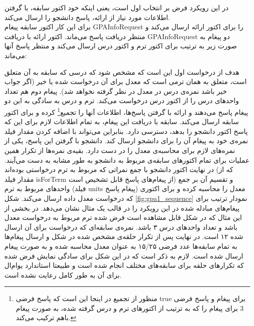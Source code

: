 در این رویکرد فرض بر انتخاب اول است، یعنی اینکه خود اکتور سابقه، با گرفتن اطلاعات مورد نیاز از ارائه، پاسخ دانشجو را ارسال می‌کند.\\
برای این کار اکتور سابقه پیغام GPAInfoRequest را برای اکتور ارائه ارسال می‌کند و منتظر دریافت پاسخ می‌ماند. اکتور ارائه با دریافت GPAInfoRequest دو پیغام به صورت زیر به ترتیب برای اکتور ترم و اکتور درس ارسال می‌کند و منتظر پاسخ آنها می‌ماند:
\begin{latin}
 \begin{description}
 \item[]
  \item[]
 \end{description}
 \end{latin}
هدف از درخواست اول این است که مشخص شود که  درسی که سابقه به آن متعلق است، متعلق به همان ترمی است که معدل برای‌ آن درخواست شده یا خیر (اگر جواب خیر باشد نمره‌ی درس در معدل در نظر گرفته نخواهد شد). پیغام دوم هم تعداد واحد‌های درس را از اکتور درس درخواست می‌کند. ترم و درس به سادگی به این دو پیغام پاسخ می‌دهند و ارائه با گرفتن پاسخ‌ها، اطلاعات آنها را تجمیع\footnote{منظور از تجمیع در اینجا این است که  پاسخ فرضی true برای پیغام  و پاسخ فرضی 3 برای پیغام  را که به ترتیب از اکتورهای ترم و درس گرفته شده، به صورت پیغام  باهم ترکیب می‌کند.} کرده و برای اکتور سابقه ارسال می‌کند.  سابقه با دریافت این پیغام، به تمام اطلاعات لازم برای این که پاسخ اکتور دانشجو را بدهد، دسترسی دارد. بنابراین می‌تواند با اضافه کردن مقدار فیلد نمره‌ی خود به پیغام آن را برای دانشجو ارسال کند. دانشجو با گرفتن این پاسخ، یکی از نمره‌های لازم برای محاسبه‌ی معدل را در دست دارد. بقیه‌ی نمره‌ها از تکرار همین عملیات برای تمام اکتورهای سابقه‌ی مربوط به دانشجو به طور مشابه به دست می‌آیند. در نهایت اکتور دانشجو با جمع نمراتی که مربوط به ترم درخواستی بوده‌اند (که از مقدار فیلد isForTerm از پیغام‌های پاسخ قابل تشخیص است) و تقسیم آن بر جمع واحد‌های مربوط به ترم (فیلد units پیغام پاسخ) معدل را محاسبه کرده و برای اکتوری که درخواست معدل داده ارسال می‌کند.
   شکل \ref{fig:gpa1_sequence} نمودار ترتیب برای پیغام‌های مبادله شده در این رویکرد را در قالب یک مثال نشان می‌دهد. در بخشی از این مثال که در شکل قابل مشاهده است فرض شده ترم مربوط به درخواست معدل باشد و تعداد واحد‌های درس ۳ باشد. نمره‌ی سابقه‌ای که درخواست برای آن ارسال شده ۱۲ است. در نهایت پس از تکرار حلقه‌ی مشخص شده در شکل و ارسال پیغام‌‌ها به تمام سابقه‌ها عدد فرضی ۱۵/۲۵ به عنوان معدل محاسبه شده و به صورت پیغام ارسال شده است. لازم به ذکر است که در این شکل برای سادگی نمایش فرض شده که تکرارهای حلقه برای سابقه‌های مختلف انجام شده است و طبیعتا استاندارد یو‌ام‌ال برای آن به طور کامل رعایت نشده است.

